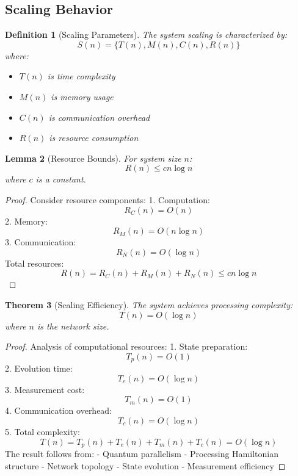 \documentclass[12pt]{article}
\newtheorem{theorem}{Theorem}[section]
\newtheorem{lemma}[theorem]{Lemma}
\newtheorem{definition}[theorem]{Definition}
\begin{document}
\subsection{Scaling Behavior}
\begin{definition}[Scaling Parameters]
The system scaling is characterized by:
\begin{equation}
S(n) = \{T(n), M(n), C(n), R(n)\}
\end{equation}
where:
\begin{itemize}
\item $T(n)$ is time complexity
\item $M(n)$ is memory usage
\item $C(n)$ is communication overhead
\item $R(n)$ is resource consumption
\end{itemize}
\end{definition}
\begin{lemma}[Resource Bounds]
For system size $n$:
\begin{equation}
R(n) \leq cn\log n
\end{equation}
where $c$ is a constant.
\end{lemma}
\begin{proof}
Consider resource components:
1. Computation:
\begin{equation}
R_C(n) = O(n)
\end{equation}
2. Memory:
\begin{equation}
R_M(n) = O(n\log n)
\end{equation}
3. Communication:
\begin{equation}
R_N(n) = O(\log n)
\end{equation}
Total resources:
\begin{equation}
R(n) = R_C(n) + R_M(n) + R_N(n) \leq cn\log n
\end{equation}
\end{proof}
\begin{theorem}[Scaling Efficiency]
The system achieves processing complexity:
\begin{equation}
T(n) = O(\log n)
\end{equation}
where $n$ is the network size.
\end{theorem}
\begin{proof}
Analysis of computational resources:
1. State preparation:
\begin{equation}
T_p(n) = O(1)
\end{equation}
2. Evolution time:
\begin{equation}
T_e(n) = O(\log n)
\end{equation}
3. Measurement cost:
\begin{equation}
T_m(n) = O(1)
\end{equation}
4. Communication overhead:
\begin{equation}
T_c(n) = O(\log n)
\end{equation}
5. Total complexity:
\begin{equation}
T(n) = T_p(n) + T_e(n) + T_m(n) + T_c(n) = O(\log n)
\end{equation}
The result follows from:
- Quantum parallelism
- Processing Hamiltonian structure
- Network topology
- State evolution
- Measurement efficiency
\end{proof}
\end{document}
